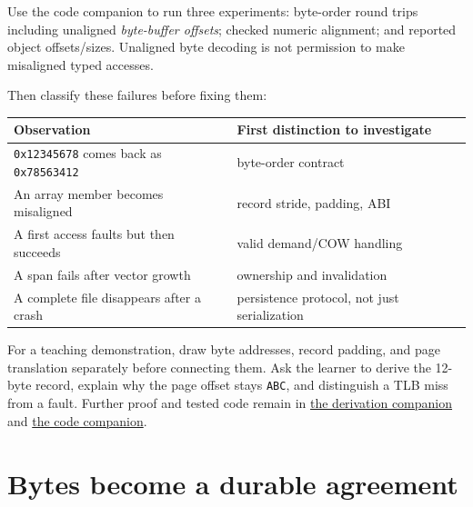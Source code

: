 Use the code companion to run three experiments: byte-order round trips including unaligned \emph{byte-buffer offsets}; checked numeric alignment; and reported object offsets/sizes. Unaligned byte decoding is not permission to make misaligned typed accesses.

Then classify these failures before fixing them:

{\def\LTcaptype{none} %
\begin{longtable}[]{@{}
  >{\raggedright\arraybackslash}p{}
  >{\raggedright\arraybackslash}p{}@{}}
\toprule\noalign{}
\begin{minipage}[b]{\linewidth}\raggedright
Observation
\end{minipage} & \begin{minipage}[b]{\linewidth}\raggedright
First distinction to investigate
\end{minipage} \\
\midrule\noalign{}
\endhead
\bottomrule\noalign{}
\endlastfoot
\texttt{0x12345678} comes back as \texttt{0x78563412} & byte-order contract \\
An array member becomes misaligned & record stride, padding, ABI \\
A first access faults but then succeeds & valid demand/COW handling \\
A span fails after vector growth & ownership and invalidation \\
A complete file disappears after a crash & persistence protocol, not just serialization \\
\end{longtable}
}

For a teaching demonstration, draw byte addresses, record padding, and page translation separately before connecting them. Ask the learner to derive the 12-byte record, explain why the page offset stays \texttt{ABC}, and distinguish a TLB miss from a fault. Further proof and tested code remain in \hyperref[01-foundations-i-ch011-m003---byte-order-layout-and-translation]{the derivation companion} and \hyperref[appendix-4e2236f53445-m003---explicit-byte-codecs-and-checked-alignment]{the code companion}.

\section{Bytes become a durable agreement}\label{05-engine-i-ch002-bytes-become-a-durable-agreement}

